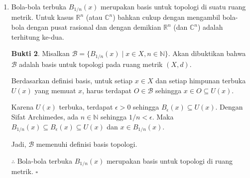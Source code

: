 \documentclass[a4paper]{article}
\theoremstyle{definition}
\newtheorem*{bukti}{Bukti}
\begin{document}
\begin{enumerate}
\begin{bukti}
          Selanjutnya akan dibuktikan bahwa $B_\epsilon(y) \subseteq B_r(x)$. Ambil sebarang titik $z \in B_\epsilon(y)$, maka berdasarkan definisi bola buka berlaku $d(y, z) < \epsilon$. Dengan menggunakan ketaksamaan segitiga pada ruang metrik, diperoleh
          \[
            d(x, z) \leq d(x, y) + d(y, z) < d(x, y) + \epsilon = d(x, y) + (r - d(x, y)) = r
          \]
          sehingga $z \in B_r(x)$. Dengan demikian, $B_\epsilon(y) \subseteq B_r(x)$.

          $\therefore$ Karena untuk setiap titik $y \in B_r(x)$ terdapat bola buka $B_\epsilon(y)$ yang seluruhnya terletak dalam $B_r(x)$, maka bola buka $B_r(x)$ adalah himpunan terbuka. \(\square\)
        \end{bukti}
  \item Bola-bola terbuka $B_{1/n}(x)$ merupakan basis untuk topologi di suatu ruang metrik. Untuk kasus $\mathbb{R}^n$ (atau $\mathbb{C}^n$) bahkan cukup dengan mengambil bola-bola dengan pusat rasional dan dengan demikian $\mathbb{R}^n$ (dan $\mathbb{C}^n$) adalah terhitung ke-dua.
        \begin{bukti}
          Misalkan $\mathcal{B} = \{ B_{1/n}(x) \mid x \in X, n \in \mathbb{N} \}$.
          Akan dibuktikan bahwa $\mathcal{B}$ adalah basis untuk topologi pada ruang metrik $(X,d)$.

          Berdasarkan definisi basis, untuk setiap $x \in X$ dan setiap himpunan terbuka $U(x)$ yang memuat $x$, harus terdapat $O \in \mathcal{B}$ sehingga $x \in O \subseteq U(x)$.

          Karena $U(x)$ terbuka, terdapat $\epsilon > 0$ sehingga $B_\epsilon(x) \subseteq U(x)$. Dengan Sifat Archimedes, ada $n \in \mathbb{N}$ sehingga $1/n < \epsilon$. Maka $B_{1/n}(x) \subseteq B_\epsilon(x) \subseteq U(x)$ dan $x \in B_{1/n}(x)$.

          Jadi, $\mathcal{B}$ memenuhi definisi basis topologi.

          $\therefore$ Bola-bola terbuka $B_{1/n}(x)$ merupakan basis untuk topologi di ruang metrik. \(\square\)
        \end{bukti}

\end{enumerate}
\end{document}
